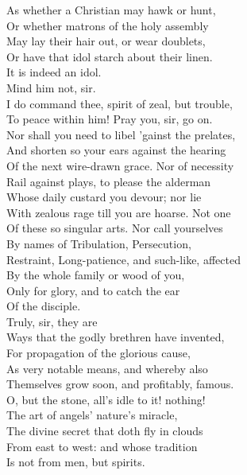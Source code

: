 \documentclass{memoir}
\begin{document}
\begin{drama*}
 As whether a Christian may hawk or hunt,\\
 Or whether matrons of the holy assembly\\
 May lay their hair out, or wear doublets,\\
 Or have that idol starch about their linen.\\
\ananiasspeaks  It is indeed an idol.\\
\tribulationspeaks {} Mind him not, sir.\\
 I do command thee, spirit of zeal, but trouble,\\
 To peace within him! Pray you, sir, go on.\\
\subtlespeaks  Nor shall you need to libel 'gainst the prelates,\\
 And shorten so your ears against the hearing\\
 Of the next wire-drawn grace. Nor of necessity\\
 Rail against plays, to please the alderman\\
 Whose daily custard you devour; nor lie\\
 With zealous rage till you are hoarse. Not one\\
 Of these so singular arts. Nor call yourselves\\
 By names of Tribulation, Persecution,\\
 Restraint, Long-patience, and such-like, affected\\
 By the whole family or wood of you,\\
 Only for glory, and to catch the ear\\
 Of the disciple.\\
\tribulationspeaks {} Truly, sir, they are\\
 Ways that the godly brethren have invented,\\
 For propagation of the glorious cause,\\
 As very notable means, and whereby also\\
 Themselves grow soon, and profitably, famous.\\
\subtlespeaks  O, but the stone, all's idle to it! nothing!\\
 The art of angels' nature's miracle,\\
 The divine secret that doth fly in clouds\\
 From east to west: and whose tradition\\
 Is not from men, but spirits.\\

\end{drama*}
\end{document}
